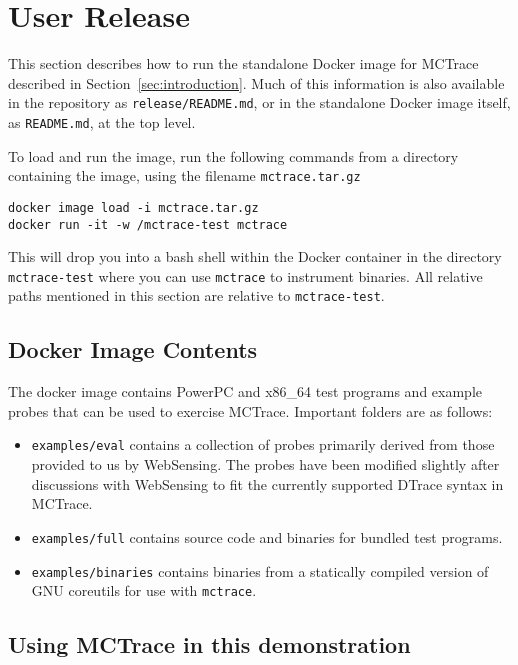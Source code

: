 \section{User Release}
\label{sec:user-release}

This section describes how to run the standalone Docker image for
MCTrace described in Section~\ref{sec:introduction}.   Much of this
information is also available in the repository as
\texttt{release/README.md}, or in the standalone Docker image itself, as
\texttt{README.md}, at the top level.

To load and run the image, run the following commands from a directory
containing the image, using the filename \texttt{mctrace.tar.gz}

\begin{verbatim}
docker image load -i mctrace.tar.gz
docker run -it -w /mctrace-test mctrace
\end{verbatim}

This will drop you into a bash shell within the Docker container in the
directory \texttt{mctrace-test} where you can use \texttt{mctrace} to instrument
binaries.  All relative paths mentioned in this section are relative to
\texttt{mctrace-test}.

\subsection{Docker Image Contents}

The docker image contains PowerPC and x86\_64 test programs and example
probes that can be used to exercise MCTrace.  Important folders are as
follows:
\begin{itemize}
\item \texttt{examples/eval} contains a collection of probes primarily derived
   from those provided to us by WebSensing. The probes have been
   modified slightly after discussions with WebSensing to fit the
  currently supported DTrace syntax in MCTrace.
\item \texttt{examples/full} contains source code and binaries for bundled test
   programs.
\item \texttt{examples/binaries} contains binaries from a statically compiled
   version of GNU coreutils for use with \texttt{mctrace}.
 \end{itemize}
 
\subsection{Using MCTrace in this demonstration}

